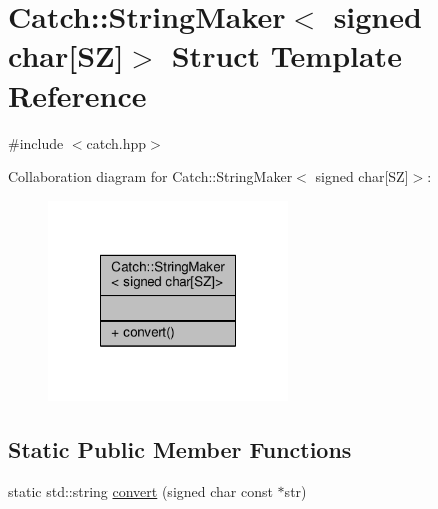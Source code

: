 \hypertarget{struct_catch_1_1_string_maker_3_01signed_01char[_s_z]_4}{\section{Catch\-:\-:String\-Maker$<$ signed char\mbox{[}S\-Z\mbox{]}$>$ Struct Template Reference}
\label{struct_catch_1_1_string_maker_3_01signed_01char[_s_z]_4}
}


{\ttfamily \#include $<$catch.\-hpp$>$}



Collaboration diagram for Catch\-:\-:String\-Maker$<$ signed char\mbox{[}S\-Z\mbox{]}$>$\-:
\nopagebreak
\begin{figure}[H]
\begin{center}
\leavevmode
\includegraphics[width=180pt]{struct_catch_1_1_string_maker_3_01signed_01char[_s_z]_4__coll__graph}
\end{center}
\end{figure}
\subsection*{Static Public Member Functions}
\begin{DoxyCompactItemize}
\item 
static std\-::string \hyperlink{struct_catch_1_1_string_maker_3_01signed_01char[_s_z]_4_a23ac689cc79dbcfe9b1765fe9e25690e}{convert} (signed char const $\ast$str)
\end{DoxyCompactItemize}


